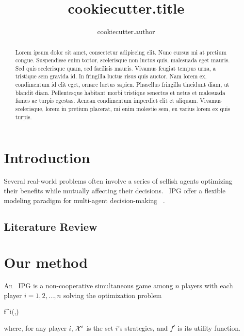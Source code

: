 \documentclass[12pt]{article}
\title{ {{cookiecutter.title}} }
\author{ {{cookiecutter.author}} \orcidA{}}
\begin{document}
\maketitle

\begin{abstract}
	Lorem ipsum dolor sit amet, consectetur adipiscing elit. Nunc cursus mi at pretium congue. Suspendisse enim tortor, scelerisque non luctus quis, malesuada eget mauris. Sed quis scelerisque quam, sed facilisis mauris. Vivamus feugiat tempus urna, a tristique sem gravida id. In fringilla luctus risus quis auctor. Nam lorem ex, condimentum id elit eget, ornare luctus sapien. Phasellus fringilla tincidunt diam, ut blandit diam. Pellentesque habitant morbi tristique senectus et netus et malesuada fames ac turpis egestas. Aenean condimentum imperdiet elit et aliquam. Vivamus scelerisque, lorem in pretium placerat, mi enim molestie sem, eu varius lorem ex quis turpis.
\end{abstract}



\section{Introduction}

Several real-world problems often involve a series of selfish agents optimizing their benefits while mutually affecting their decisions. ~\gls{IPG} offer a flexible modeling paradigm for multi-agent decision-making ~\cite{conforti2014}.



\subsection{Literature Review}

\section{Our method}

\begin{definition}
	An ~\gls{IPG} is a non-cooperative simultaneous game among $n$ players with each player $i=1,2,\dots,n$ solving the optimization problem
	\begin{mini!}
		{\xofi}{f^i(\xofi,\xminusi)  \protect\label{eq:IPG:Obj}}
		{\label{eq:IPG}}{}
	\end{mini!}
	where, for any player $i$, $\mathcal{X}^{ i }$ is the set $i$'s strategies, and $f^i$ is its utility function.
	\label{def:IPG}
\end{definition}
\end{document}
